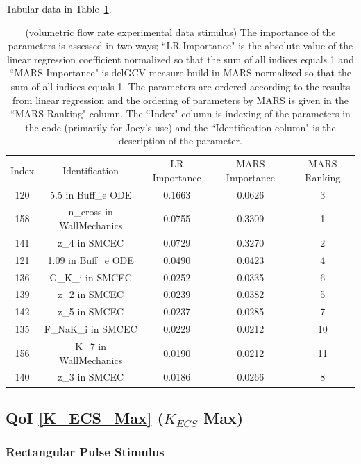 \documentclass[12pt]{article}
\numberwithin{equation}{section}
\begin{document}
Tabular data in Table~\ref{qoi_vol_flow_ex}.

\begin{table}[h]
\centering
\begin{tabular}{ccccc}
Index & Identification & LR Importance & MARS Importance & MARS Ranking \\
   120 & 5.5 in Buff\_e ODE & 0.1663 & 0.0626 & 3\\
   158 & n\_cross in WallMechanics  & 0.0755 & 0.3309 & 1\\
   141 & z\_4 in SMCEC & 0.0729 & 0.3270 & 2\\
   121 & 1.09 in Buff\_e ODE & 0.0490 & 0.0423 & 4\\
   136 & G\_K\_i in SMCEC & 0.0252 & 0.0335 & 6\\
   139 & z\_2 in SMCEC & 0.0239 & 0.0382 & 5\\
   142 & z\_5 in SMCEC & 0.0237 & 0.0285 & 7\\
   135 & F\_NaK\_i in SMCEC & 0.0229 & 0.0212 & 10\\
   156 & K\_7 in WallMechanics & 0.0190 & 0.0212 & 11\\
   140 & z\_3 in SMCEC & 0.0186 & 0.0266 & 8\\
\end{tabular}
\caption{(volumetric flow rate experimental data stimulus) The importance of the parameters is assessed in two ways; ``LR Importance" is the absolute value of the linear regression coefficient normalized so that the sum of all indices equals 1 and ``MARS Importance" is delGCV measure build in MARS normalized so that the sum of all indices equals 1. The parameters are ordered according to the results from linear regression and the ordering of parameters by MARS is given in the ``MARS Ranking" column. The ``Index" column is indexing of the parameters in the code (primarily for Joey's use) and the ``Identification column" is the description of the parameter.}
\label{qoi_vol_flow_ex}
\end{table}

\newpage

\subsection{QoI \eqref{K_ECS_Max} ($K_{ECS}$ Max)}

\subsubsection{Rectangular Pulse Stimulus}
\end{document}
